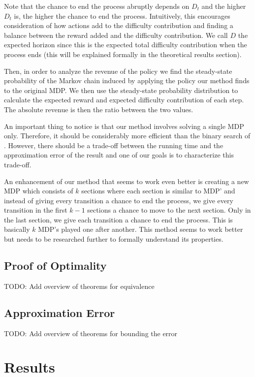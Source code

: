 \documentclass{article}
\begin{document}
Note that the chance to end the process abruptly depends on $D_t$ and the higher $D_t$ is, the higher the chance to end the process. Intuitively, this encourages consideration of how actions add to the difficulty contribution and finding a balance between the reward added and the difficulty contribution. We call $D$ the expected horizon since this is the expected total difficulty contribution when the process ends (this will be explained formally in the theoretical results section).

Then, in order to analyze the revenue of the policy we find the steady-state probability of the Markov chain induced by applying the policy our method finds to the original MDP. We then use the steady-state probability distribution to calculate the expected reward and expected difficulty contribution of each step. The absolute revenue is then the ratio between the two values.

An important thing to notice is that our method involves solving a single MDP only. Therefore, it should be considerably more efficient than the binary search of \cite{sapirshtein2016optimal}. However, there should be a trade-off between the running time and the approximation error of the result and one of our goals is to characterize this trade-off.

An enhancement of our method that seems to work even better is creating a new MDP which consists of $k$ sections where each section is similar to MDP' and instead of giving every transition a chance to end the process, we give every transition in the first $k - 1$ sections a chance to move to the next section. Only in the last section, we give each transition a chance to end the process. This is basically $k$ MDP's played one after another. This method seems to work better but needs to be researched further to formally understand its properties.

\subsection{Proof of Optimality}
TODO: Add overview of theorems for equivalence

\subsection{Approximation Error}
TODO: Add overview of theorems for bounding the error

\section{Results}
\end{document}
